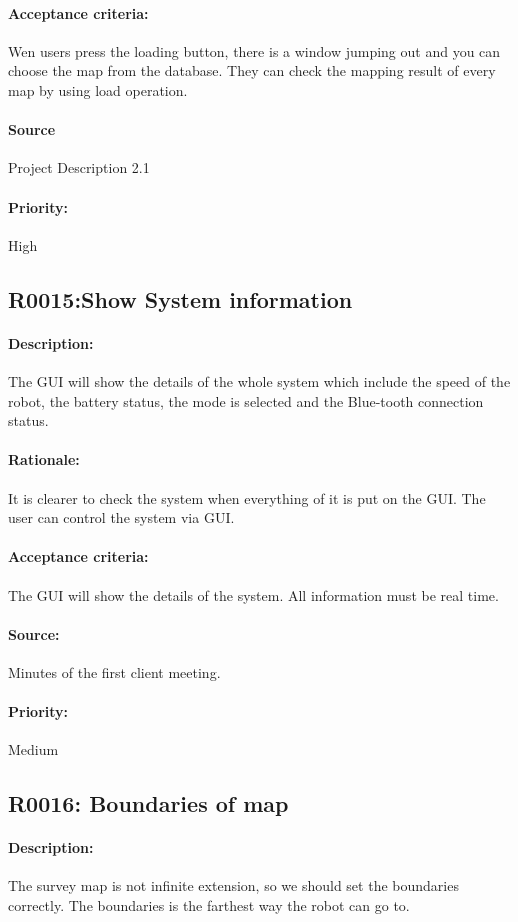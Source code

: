 \documentclass[11pt, a4paper]{report}
\begin{document}
\paragraph{Acceptance criteria:}
Wen users press the loading button, there is a window jumping out and you can choose the map from the database. They can check the mapping result of every map by using load operation.
\paragraph{Source}
 Project Description 2.1
\paragraph{Priority:}
High


\subsection{R0015:Show System information}
\paragraph{Description:}
The GUI will show the details of the whole system which include the speed of the robot, the battery status, the mode is selected and the Blue-tooth connection status.
\paragraph{Rationale:}
It is clearer to check the system when everything of it is put on the GUI. The user can control the system via GUI.
\paragraph{Acceptance criteria:}
The GUI will show the details of the system. All information must be real time.
\paragraph{Source:}
Minutes of the first client meeting.
\paragraph{Priority:}
Medium


\subsection{R0016: Boundaries of map}
\paragraph{Description:}
The survey map is not infinite extension, so we should set the boundaries correctly. The boundaries is the farthest way the robot can go to.
\end{document}
